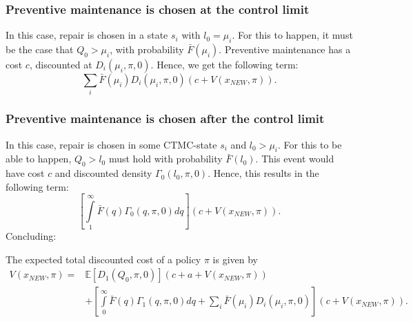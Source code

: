 \subsubsection{Preventive maintenance is chosen at the control limit}
In this case, repair is chosen in a state $s_i$ with $l_0=\mu_i$.
For this to happen, it must be the case that $Q_0>\mu_i$, with probability $\bar{F}(\mu_i)$.
Preventive maintenance has a cost $c$, discounted at $D_{i}(\mu_i,\pi,0)$.
Hence, we get the following term:
\[
\sum\limits_i\bar{F}(\mu_i)D_{i}(\mu_i,\pi,0)(c+V(x_{NEW},\pi)).
\]

\subsubsection{Preventive maintenance is chosen after the control limit}
In this case, repair is chosen in some CTMC-state $s_i$ and $l_0>\mu_i$.
For this to be able to happen, $Q_0>l_0$ must hold with probability $\bar{F}(l_0)$.
This event would have cost $c$ and discounted density $\Gamma_0(l_0,\pi,0)$.
Hence, this results in the following term:
\[
\left[\int\limits_1^\infty \bar{F}(q)\Gamma_0(q,\pi,0)dq\right](c+V(x_{NEW},\pi)).
\]
Concluding:
\begin{theorem}
	The expected total discounted cost of a policy $\pi$ is given by
	\begin{equation}\label{eq:MmfmTDC}
	\begin{split}
	V(x_{NEW},\pi)=&\mathbb{E}[D_{1}(Q_0,\pi,0)]\left(c+a+V(x_{NEW},\pi)\right)\\
	&+\left[\int\limits_0^\infty \bar{F}(q)\Gamma_1(q,\pi,0)dq+\sum\limits_i\bar{F}(\mu_i)D_{i}(\mu_i,\pi,0)\right]\left(c+V(x_{NEW},\pi)\right).
	\end{split}
	\end{equation}
\end{theorem}